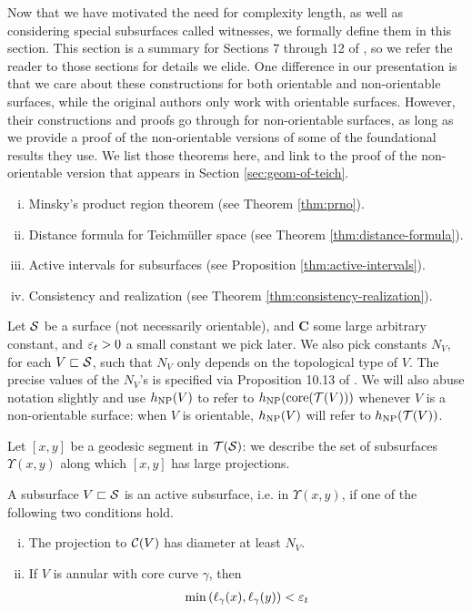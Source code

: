 \documentclass[12pt, reqno]{amsart}
\begin{document}
Now that we have motivated the need for complexity length, as well as considering special subsurfaces called witnesses, we formally define them in this section.
This section is a summary for Sections 7 through 12 of \textcite{dowdall2023lattice}, so we refer the reader to those sections for details we elide.
One difference in our presentation is that we care about these constructions for both orientable and non-orientable surfaces, while the original authors only work with orientable surfaces.
However, their constructions and proofs go through for non-orientable surfaces, as long as we provide a proof of the non-orientable versions of some of the foundational results they use.
We list those theorems here, and link to the proof of the non-orientable version that appears in Section \ref{sec:geom-of-teich}.
\begin{enumerate}[(i)]
\item Minsky's product region theorem (see Theorem \ref{thm:prno}).
\item Distance formula for Teichmüller space (see Theorem \ref{thm:distance-formula}).
\item Active intervals for subsurfaces (see Proposition \ref{thm:active-intervals}).
\item Consistency and realization (see Theorem \ref{thm:consistency-realization}).
\end{enumerate}

Let $\mathcal{S}$ be a surface (not necessarily orientable), and $\mathbf{C}$ some large arbitrary constant, and $\varepsilon_t > 0$ a small constant we pick later.
We also pick constants $N_V$, for each $V \sqsubset \mathcal{S}$, such that $N_V$ only depends on the topological type of $V$.
The precise values of the $N_V$'s is specified via Proposition 10.13 of \cite{dowdall2023lattice}.
We will also abuse notation slightly and use $h_{\mathrm{NP}}(V)$ to refer to $h_{\mathrm{NP}}(\mathrm{core}(\mathcal{T}(V)))$ whenever $V$ is a non-orientable surface: when $V$ is orientable, $h_{\mathrm{NP}}(V)$ will refer to $h_{\mathrm{NP}}(\mathcal{T}(V))$.

Let $[x,y]$ be a geodesic segment in $\mathcal{T}(\mathcal{S})$: we describe the set of subsurfaces $\Upsilon(x, y)$ along which $[x, y]$ has large projections.

\begin{definition}
  A subsurface $V \sqsubset \mathcal{S}$ is an active subsurface, i.e. in $\Upsilon(x,y)$, if one of the following two conditions hold.
  \begin{enumerate}[(i)]
  \item The projection to $\mathcal{C}(V)$ has diameter at least $N_V$.
  \item If $V$ is annular with core curve $\gamma$, then
    \begin{align*}
      \min\left( \ell_\gamma(x), \ell_{\gamma}(y) \right) < \varepsilon_t
    \end{align*}
  \end{enumerate}
\end{definition}
\end{document}
